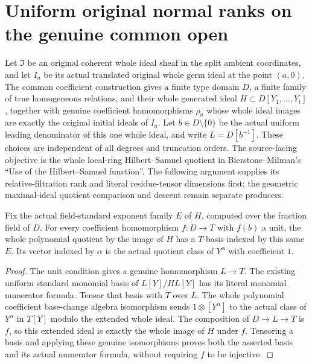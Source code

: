 \section{Uniform original normal ranks on the genuine common open}

Let $\mathfrak I$ be an original coherent whole ideal sheaf in the split
ambient coordinates, and let $I_a$ be its actual translated original whole
germ ideal at the point $(a,0)$. The common coefficient construction gives
a finite type domain $D$, a finite family of true homogeneous relations,
and their whole generated ideal $H\subset D[Y_1,\ldots,Y_t]$, together
with genuine coefficient homomorphisms $\rho_a$ whose whole ideal images
are exactly the original initial ideals of $I_a$. Let $b\in D\setminus\{0\}$
be the actual uniform leading denominator of this one whole ideal, and
write $L=D[b^{-1}]$. These choices are independent of all degrees and
truncation orders. The source-facing objective is the whole local-ring
Hilbert--Samuel quotient in Bierstone--Milman's ``Use of the Hilbert--Samuel
function''. The following argument supplies its relative-filtration rank and
literal residue-tensor dimensions first; the geometric maximal-ideal quotient
comparison and descent remain separate producers.

\begin{lemma}
\label{hir:relative-normal-nearby-coefficient-standard-basis}
\leanok
{}
Fix the actual field-standard exponent family $E$ of $H$, computed over
the fraction field of $D$. For every coefficient homomorphism $f:D\to T$
with $f(b)$ a unit, the whole polynomial quotient by the image of $H$ has
a $T$-basis indexed by this same $E$. Its vector indexed by $\alpha$ is
the actual quotient class of $Y^\alpha$ with coefficient $1$.
\end{lemma}
\begin{proof}
The unit condition gives a genuine homomorphism $L\to T$. The existing
uniform standard monomial basis of $L[Y]/HL[Y]$ has its literal monomial
numerator formula. Tensor that basis with $T$ over $L$. The whole polynomial
coefficient base-change algebra isomorphism sends $1\otimes[Y^\alpha]$
to the actual class of $Y^\alpha$ in $T[Y]$ modulo the extended whole
ideal. The composition of $D\to L\to T$ is $f$, so this extended ideal
is exactly the whole image of $H$ under $f$. Tensoring a basis and applying
these genuine isomorphisms proves both the asserted basis and its actual
numerator formula, without requiring $f$ to be injective.
\end{proof}

